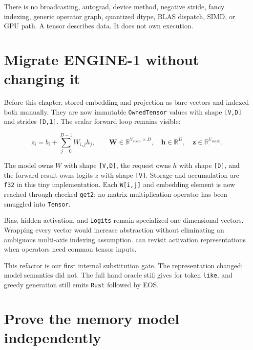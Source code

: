 There is no broadcasting, autograd, device method, negative stride,
fancy indexing, generic operator graph, quantized dtype, BLAS dispatch,
SIMD, or GPU path. A tensor describes data. It does not own execution.

\section{Migrate ENGINE-1 without changing
it}\label{migrate-engine-1-without-changing-it}

Before this chapter, \texttt{} stored
embedding and projection as bare vectors and indexed both manually. They
are now immutable \texttt{OwnedTensor} values with shape
\texttt{{[}V,D{]}} and strides \texttt{{[}D,1{]}}. The scalar forward
loop remains visible:

\begin{equation}
z_i=b_i+\sum_{j=0}^{D-1}W_{i,j}h_j,
\qquad
\mathbf{W}\in\mathbb{R}^{V_{\mathrm{vocab}}\times D},
\quad \mathbf{h}\in\mathbb{R}^{D},
\quad \mathbf{z}\in\mathbb{R}^{V_{\mathrm{vocab}}}.
\end{equation}

The model owns \(W\) with shape \texttt{{[}V,D{]}}, the request owns
\(h\) with shape \texttt{{[}D{]}}, and the forward result owns logits
\(z\) with shape \texttt{{[}V{]}}. Storage and accumulation are
\texttt{f32} in this tiny implementation. Each \texttt{W{[}i,j{]}} and
embedding element is now reached through checked \texttt{get2}; no
matrix multiplication operator has been smuggled into \texttt{Tensor}.

Bias, hidden activation, and \texttt{Logits} remain specialized
one-dimensional vectors. Wrapping every vector would increase
abstraction without eliminating an ambiguous multi-axis indexing
assumption.  can revisit activation representations when
operators need common tensor inputs.

This refactor is our first internal substitution gate. The
representation changed; model semantics did not. The full hand oracle
still gives \texttt{\seqsplit{[-0.7,0.1,0.4,2.2]}} for token
\texttt{like}, and greedy generation still emits \texttt{Rust} followed
by EOS.

\section{Prove the memory model
independently}\label{prove-the-memory-model-independently}

